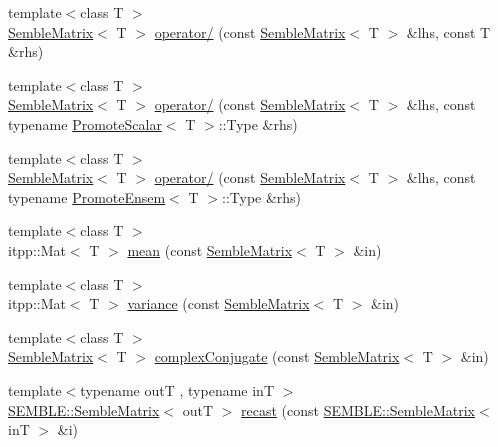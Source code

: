 \begin{DoxyCompactItemize}
\item 
{\footnotesize template$<$class T $>$ }\\\mbox{\hyperlink{structSEMBLE_1_1SembleMatrix}{Semble\+Matrix}}$<$ T $>$ \mbox{\hyperlink{namespaceSEMBLE_abe8b5c5cd589f2949e9c134d9fdc7b64}{operator/}} (const \mbox{\hyperlink{structSEMBLE_1_1SembleMatrix}{Semble\+Matrix}}$<$ T $>$ \&lhs, const T \&rhs)
\item 
{\footnotesize template$<$class T $>$ }\\\mbox{\hyperlink{structSEMBLE_1_1SembleMatrix}{Semble\+Matrix}}$<$ T $>$ \mbox{\hyperlink{namespaceSEMBLE_a7ee0f7fb882f9f2b52e66fdd2043b659}{operator/}} (const \mbox{\hyperlink{structSEMBLE_1_1SembleMatrix}{Semble\+Matrix}}$<$ T $>$ \&lhs, const typename \mbox{\hyperlink{structSEMBLE_1_1PromoteScalar}{Promote\+Scalar}}$<$ T $>$\+::Type \&rhs)
\item 
{\footnotesize template$<$class T $>$ }\\\mbox{\hyperlink{structSEMBLE_1_1SembleMatrix}{Semble\+Matrix}}$<$ T $>$ \mbox{\hyperlink{namespaceSEMBLE_ac83596afe76161af0e77ecee21d378dd}{operator/}} (const \mbox{\hyperlink{structSEMBLE_1_1SembleMatrix}{Semble\+Matrix}}$<$ T $>$ \&lhs, const typename \mbox{\hyperlink{structSEMBLE_1_1PromoteEnsem}{Promote\+Ensem}}$<$ T $>$\+::Type \&rhs)
\item 
{\footnotesize template$<$class T $>$ }\\itpp\+::\+Mat$<$ T $>$ \mbox{\hyperlink{namespaceSEMBLE_a350af9bd145f4f0271cad126a631eb4c}{mean}} (const \mbox{\hyperlink{structSEMBLE_1_1SembleMatrix}{Semble\+Matrix}}$<$ T $>$ \&in)
\item 
{\footnotesize template$<$class T $>$ }\\itpp\+::\+Mat$<$ T $>$ \mbox{\hyperlink{namespaceSEMBLE_a68dde1a91ae631873d4f3816c77c9eaf}{variance}} (const \mbox{\hyperlink{structSEMBLE_1_1SembleMatrix}{Semble\+Matrix}}$<$ T $>$ \&in)
\item 
{\footnotesize template$<$class T $>$ }\\\mbox{\hyperlink{structSEMBLE_1_1SembleMatrix}{Semble\+Matrix}}$<$ T $>$ \mbox{\hyperlink{namespaceSEMBLE_ab6febd5fd53bd336b16c0eaa5d8a2ecd}{complex\+Conjugate}} (const \mbox{\hyperlink{structSEMBLE_1_1SembleMatrix}{Semble\+Matrix}}$<$ T $>$ \&in)
\item 
{\footnotesize template$<$typename outT , typename inT $>$ }\\\mbox{\hyperlink{structSEMBLE_1_1SembleMatrix}{S\+E\+M\+B\+L\+E\+::\+Semble\+Matrix}}$<$ outT $>$ \mbox{\hyperlink{namespaceSEMBLE_aadf363e3d771bf4bdedc288745a2c5a8}{recast}} (const \mbox{\hyperlink{structSEMBLE_1_1SembleMatrix}{S\+E\+M\+B\+L\+E\+::\+Semble\+Matrix}}$<$ inT $>$ \&i)

\end{DoxyCompactItemize}
